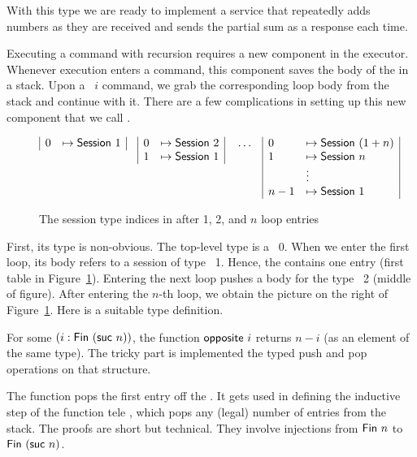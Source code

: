 \documentclass[acmsmall,screen,anonymous,review]{acmart}
\begin{document}
With this type we are ready to implement a
service that repeatedly adds numbers as they are received and sends the partial
sum as a response each time.
\rstSumupCommand

Executing a command with recursion requires a new component in the
executor. Whenever execution enters a {\AMU} command, this component
saves the body of the {\AMU} in a stack. Upon a {\ACONTINUE~$i$}
command, we grab the corresponding loop body from the stack and
continue with it. There are a few complications in setting up this new
component that we call {\ACommandStore}.

\begin{figure}[tp]
  \begin{align*}
    &
      \begin{array}[t]{|ll|}
        0 &\mapsto \ASession~1
      \end{array}
    &&
      \begin{array}[t]{|ll|}
        0 &\mapsto \ASession~2 \\
        1 &\mapsto \ASession~1
      \end{array}
          &&
             \dots
    &&
       \begin{array}[t]{|ll|}
         0 & \mapsto \ASession~(1+n) \\
         1 & \mapsto \ASession~n \\
           & \vdots \\
         n-1 & \mapsto \ASession~1
       \end{array}
  \end{align*}
  \caption{The session type indices in {\ACommandStore} after 1, 2, and $n$ loop entries}
  \label{fig:commandstore}
\end{figure}
First, its type is non-obvious.  The top-level type is a
{\ASession~0}. When we enter the first loop, its body refers to a
session of type {\ASession~1}. Hence, the {\ACommandStore} contains
one entry (first table in Figure~\ref{fig:commandstore}).
Entering the next loop pushes a body for the type {\ASession~2}
(middle of figure). After entering the $n$-th loop, we obtain the
picture on the right of Figure~\ref{fig:commandstore}. Here is a
suitable type definition.
\rstCommandStore

For some $(i : \AFin~(\Asuc~ n))$, the function
$\AgdaFunction{opposite}~i$ returns $n-i$ (as an element of the same
type). The tricky part is implemented the typed push and pop operations on
that structure.
\rstPops

The  function pops the first entry off the
{\ACommandStore}. It gets used in defining the inductive step of the
function tele
, which pops any (legal) number of entries
from the stack. The proofs are short but technical. They involve
injections from $\AFin~n$ to $\AFin~(\Asuc~n)$.
\end{document}
